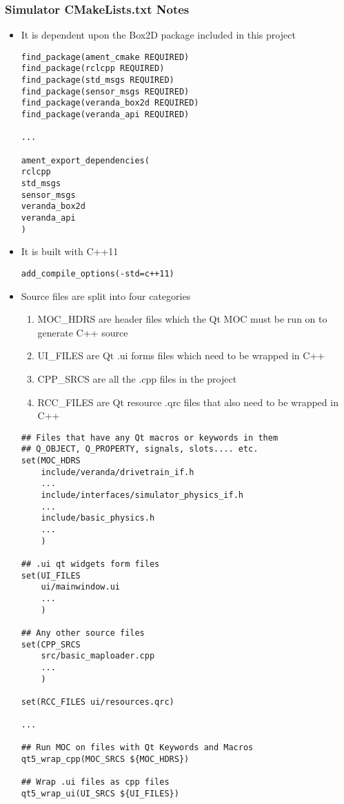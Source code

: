 \subsubsection*{Simulator CMakeLists.txt Notes}
\begin{itemize}
	\item It is dependent upon the Box2D package included in this project
	\begin{lstlisting}
find_package(ament_cmake REQUIRED)
find_package(rclcpp REQUIRED)
find_package(std_msgs REQUIRED)
find_package(sensor_msgs REQUIRED)
find_package(veranda_box2d REQUIRED)
find_package(veranda_api REQUIRED)

...

ament_export_dependencies(    
rclcpp
std_msgs
sensor_msgs
veranda_box2d
veranda_api
)
	\end{lstlisting}
	\item It is built with C++11
	\begin{lstlisting}
add_compile_options(-std=c++11)
	\end{lstlisting}
	\item Source files are split into four categories
	\begin{enumerate}
		\item MOC\_HDRS are header files which the Qt MOC must be run on to generate C++ source
		\item UI\_FILES are Qt .ui forms files which need to be wrapped in C++
		\item CPP\_SRCS are all the .cpp files in the project
		\item RCC\_FILES are Qt resource .qrc files that also need to be wrapped in C++
	\end{enumerate}
	\begin{lstlisting}
## Files that have any Qt macros or keywords in them
## Q_OBJECT, Q_PROPERTY, signals, slots.... etc.
set(MOC_HDRS
    include/veranda/drivetrain_if.h
    ...
    include/interfaces/simulator_physics_if.h
    ...
    include/basic_physics.h
    ...
    )

## .ui qt widgets form files
set(UI_FILES
    ui/mainwindow.ui
    ...
    )

## Any other source files
set(CPP_SRCS
    src/basic_maploader.cpp
    ...
    )

set(RCC_FILES ui/resources.qrc)

...

## Run MOC on files with Qt Keywords and Macros
qt5_wrap_cpp(MOC_SRCS ${MOC_HDRS})

## Wrap .ui files as cpp files
qt5_wrap_ui(UI_SRCS ${UI_FILES})


\end{lstlisting}
\end{itemize}
